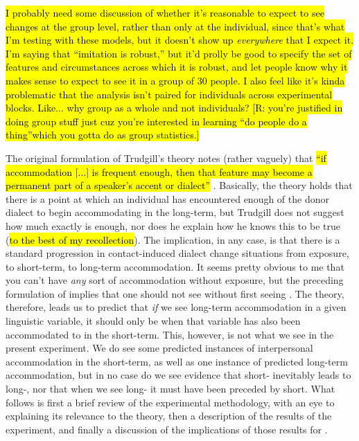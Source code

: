     \hl{I probably need some discussion of whether it's reasonable to expect to see changes at the group level, rather than only at the individual, since that's what I'm testing with these models, but it doesn't show up \textit{everywhere} that I expect it. I'm saying that ``imitation is robust,'' but it'd prolly be good to specify the set of features and circumstances across which it is robust, and let people know why it makes sense to expect to see it in a group of 30 people. I also feel like it's kinda problematic that the analysis isn't paired for individuals across experimental blocks. Like... why group as a whole and not individuals? [R: you're justified in doing group stuff just cuz you're interested in learning ``do people do a thing''which you gotta do as group statistics.]}
    
    The original formulation of Trudgill's theory notes (rather vaguely) that \hl{``if accommodation [...] is frequent enough, then that feature may become a permanent part of a speaker's accent or dialect''} \citeyearpar[p. 40]{trudgill1986dialects}. Basically, the theory holds that there is a point at which an individual has encountered enough of the donor dialect to begin accommodating in the long-term, but Trudgill does not suggest how much exactly is enough, nor does he explain how he knows this to be true (\hl{to the best of my recollection}). The implication, in any case, is that there is a standard progression in contact-induced dialect change situations from exposure, to short-term, to long-term accommodation. It seems pretty obvious to me that you can't have \emph{any} sort of accommodation without exposure, but the preceding formulation of \cbat{} implies that one should not see \lta{} without first seeing \sta{}. The theory, therefore, leads us to predict that \emph{if} we see long-term accommodation in a given linguistic variable, it should only be when that variable has also been accommodated to in the short-term. This, however, is not what we see in the present experiment. We do see some predicted instances of interpersonal accommodation in the short-term, as well as one instance of predicted long-term accommodation, but in no case do we see evidence that short- inevitably leads to long-, nor that when we see long- it must have been preceded by short. What follows is first a brief review of the experimental methodology, with an eye to explaining its relevance to the theory, then a description of the results of the experiment, and finally a discussion of the implications of those results for \cbat{}. %

